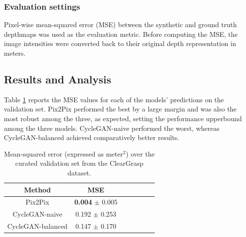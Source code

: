 \subsubsection{Evaluation settings}
Pixel-wise mean-squared error (MSE) between the synthetic and ground truth depthmaps was used as the evaluation metric. Before computing the MSE, the image intensities were converted back to their original depth representation in meters.


\subsection{Results and Analysis}
Table \ref{tab:cleargrasp_quant} reports the MSE values for each of the models' predictions on the validation set. Pix2Pix performed the best by a large margin and was also the most robust among the three, as expected, setting the performance upperbound among the three models. CycleGAN-naive performed the worst, whereas CycleGAN-balanced achieved comparatively better results. 

\begin{table}[h!]
    \small
    \centering
    \begin{tabular}{ccccccc}
        \textbf{Method} & \textbf{MSE} \\
        \hline
        Pix2Pix    & \textbf{0.004} $\pm$ 0.005 \\
        CycleGAN-naive    & 0.192 $\pm$ 0.253 \\
        CycleGAN-balanced    & 0.147 $\pm$ 0.170 \\
    \end{tabular}
    \caption{Mean-squared error (expressed as meter$^2$) over the curated validation set from the ClearGrasp dataset.}
    \label{tab:cleargrasp_quant}
\end{table}

